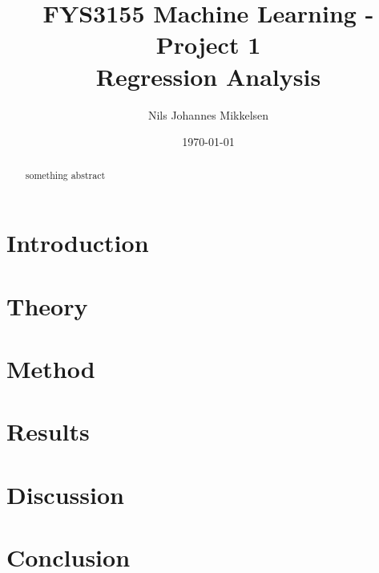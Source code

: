 \documentclass[reprint,english]{revtex4-1}
\begin{document}
\title{FYS3155 Machine Learning - Project 1\\Regression Analysis}
\author{Nils Johannes Mikkelsen}
\date{\today}
\noaffiliation
\begin{abstract}
something abstract
\end{abstract}
\maketitle

\section{Introduction}
\section{Theory}
\section{Method}

\section{Results}
\section{Discussion}
\section{Conclusion}

\nocite{lecture_ode}\nocite{lecture_linalg}\nocite{eigenvalues}


\end{document}
